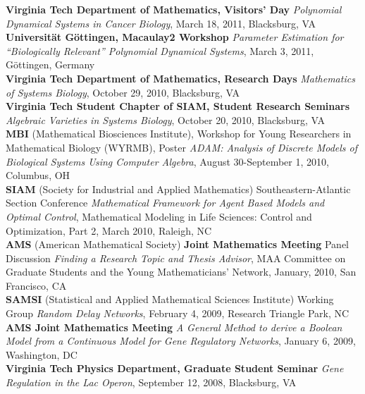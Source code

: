\documentclass[10pt]{article}
\begin{document}
  \textbf{Virginia Tech Department of Mathematics, Visitors' Day}
  \textit{Polynomial Dynamical Systems in Cancer Biology}, March 18, 2011,
  Blacksburg, VA\\

  \textbf{Universit\"at G\"ottingen, Macaulay2 Workshop} \textit{Parameter
  Estimation for ``Biologically Relevant'' Polynomial Dynamical Systems}, March
  3, 2011, G\"ottingen, Germany\\

  \textbf{Virginia Tech Department of Mathematics, Research Days}
  \textit{Mathematics of Systems Biology}, October 29, 2010, Blacksburg, VA \\

  \textbf{Virginia Tech Student Chapter of SIAM, Student Research Seminars}
  \textit{Algebraic Varieties in Systems Biology}, October 20, 2010, Blacksburg, VA \\

  \textbf{MBI} (Mathematical Biosciences Institute), Workshop for Young Researchers 
  in Mathematical Biology (WYRMB), Poster \textit{ADAM: Analysis of Discrete
  Models of Biological Systems Using Computer Algebra}, August 30-September 1,
  2010, Columbus, OH\\

  \textbf{SIAM} (Society for Industrial and Applied Mathematics)
  Southeastern-Atlantic Section Conference \textit{Mathematical Framework for
  Agent Based Models and Optimal Control}, Mathematical Modeling in Life
  Sciences: Control and Optimization, Part 2, March 2010, Raleigh, NC\\

  \textbf{AMS} (American Mathematical Society) \textbf{Joint Mathematics Meeting} 
  Panel Discussion \textit{Finding a Research Topic and Thesis Advisor}, MAA Committee on Graduate
  Students and the Young Mathematicians' Network, January, 2010, San Francisco,
  CA\\

  \textbf{SAMSI} (Statistical and Applied Mathematical Sciences Institute) 
  Working Group \textit{Random Delay Networks}, February
  4, 2009, Research Triangle Park, NC\\

  \textbf{AMS Joint Mathematics Meeting} \textit{A General Method to derive
  a Boolean Model from a Continuous Model for Gene Regulatory Networks}, January
  6, 2009, Washington, DC\\

  \textbf{Virginia Tech Physics Department, Graduate Student Seminar}
  \textit{Gene Regulation in the Lac Operon}, September 12, 2008, Blacksburg, VA\\
\end{document}
